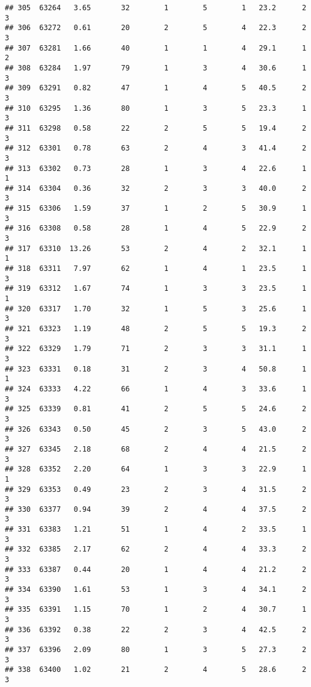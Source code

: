 \documentclass[
]{article}
\begin{document}
\begin{verbatim}
## 305  63264   3.65       32        1        5        1   23.2      2      3
## 306  63272   0.61       20        2        5        4   22.3      2      3
## 307  63281   1.66       40        1        1        4   29.1      1      2
## 308  63284   1.97       79        1        3        4   30.6      1      3
## 309  63291   0.82       47        1        4        5   40.5      2      3
## 310  63295   1.36       80        1        3        5   23.3      1      3
## 311  63298   0.58       22        2        5        5   19.4      2      3
## 312  63301   0.78       63        2        4        3   41.4      2      3
## 313  63302   0.73       28        1        3        4   22.6      1      1
## 314  63304   0.36       32        2        3        3   40.0      2      3
## 315  63306   1.59       37        1        2        5   30.9      1      3
## 316  63308   0.58       28        1        4        5   22.9      2      3
## 317  63310  13.26       53        2        4        2   32.1      1      1
## 318  63311   7.97       62        1        4        1   23.5      1      3
## 319  63312   1.67       74        1        3        3   23.5      1      1
## 320  63317   1.70       32        1        5        3   25.6      1      3
## 321  63323   1.19       48        2        5        5   19.3      2      3
## 322  63329   1.79       71        2        3        3   31.1      1      3
## 323  63331   0.18       31        2        3        4   50.8      1      1
## 324  63333   4.22       66        1        4        3   33.6      1      3
## 325  63339   0.81       41        2        5        5   24.6      2      3
## 326  63343   0.50       45        2        3        5   43.0      2      3
## 327  63345   2.18       68        2        4        4   21.5      2      3
## 328  63352   2.20       64        1        3        3   22.9      1      1
## 329  63353   0.49       23        2        3        4   31.5      2      3
## 330  63377   0.94       39        2        4        4   37.5      2      3
## 331  63383   1.21       51        1        4        2   33.5      1      3
## 332  63385   2.17       62        2        4        4   33.3      2      3
## 333  63387   0.44       20        1        4        4   21.2      2      3
## 334  63390   1.61       53        1        3        4   34.1      2      3
## 335  63391   1.15       70        1        2        4   30.7      1      3
## 336  63392   0.38       22        2        3        4   42.5      2      3
## 337  63396   2.09       80        1        3        5   27.3      2      3
## 338  63400   1.02       21        2        4        5   28.6      2      3

\end{verbatim}
\end{document}
